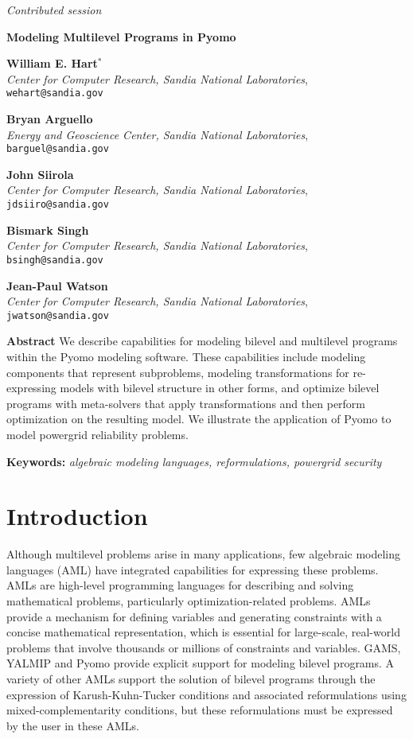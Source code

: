 \documentclass[a4paper,11pt]{article}
\newenvironment{vuoto}{}{}
\newenvironment{abst}{
\textbf{Abstract}\begin{vuoto}}{
\end{vuoto}}
\newenvironment{keyw}{
\textbf{Keywords:}\begin{vuoto}}{
\end{vuoto}}
\newcommand{\papertitle}[1]{%
\begin{center}
\LARGE \textbf{#1} \\
\vspace*{0.5cm}
}
\newcommand{\session}[1]{%
\newpage
\begin{center}
\textit{#1} \\
\end{center}
\vspace*{0.5cm}
}
\newcommand{\presentername}[1]{%
\normalsize
\textbf{#1}$^*$ \\
}
\newcommand{\presenteraffiliation}[2]{%
\normalsize \emph{#1}, \texttt{#2} \\
\vspace*{1ex} 
}
\newcommand{\coauthorname}[1]{%
\normalsize
\textbf{#1} \\
}
\newcommand{\paperabstract}[1]{%
\setcounter{figure}{0}
\end{center}
\begin{abst}
\normalsize #1
\end{abst}
\vspace*{1ex}
}
\newcommand{\paperkeywords}[1]{%
\begin{keyw}
\normalsize \emph{#1}
\end{keyw}
\vspace*{1ex}
}
\begin{document}


\session{Contributed session}
\papertitle{Modeling Multilevel Programs in Pyomo}
\presentername{William E. Hart}
\presenteraffiliation{Center for Computer Research, Sandia National Laboratories}{wehart@sandia.gov}
\coauthorname{Bryan Arguello}
\presenteraffiliation{Energy and Geoscience Center, Sandia National Laboratories}{barguel@sandia.gov}
\coauthorname{John Siirola}
\presenteraffiliation{Center for Computer Research, Sandia National Laboratories}{jdsiiro@sandia.gov}
\coauthorname{Bismark Singh}
\presenteraffiliation{Center for Computer Research, Sandia National Laboratories}{bsingh@sandia.gov}
\coauthorname{Jean-Paul Watson}
\presenteraffiliation{Center for Computer Research, Sandia National Laboratories}{jwatson@sandia.gov}


\paperabstract{
We describe capabilities for modeling bilevel and multilevel programs
within the Pyomo modeling software.  These capabilities include
modeling components that represent subproblems, modeling transformations
for re-expressing models with bilevel structure in other forms, and
optimize bilevel programs with meta-solvers that apply transformations
and then perform optimization on the resulting model.  We illustrate
the application of Pyomo to model powergrid reliability problems.
}


\paperkeywords{algebraic modeling languages, reformulations, powergrid security}

\section{Introduction}

Although multilevel problems arise in many applications, few algebraic
modeling languages (AML) have integrated capabilities for expressing
these problems.  AMLs are high-level programming languages for
describing and solving mathematical problems, particularly
optimization-related problems.  AMLs provide a mechanism
for defining variables and generating constraints with a concise
mathematical representation, which is essential for large-scale,
real-world problems that involve thousands or millions of constraints
and variables.  GAMS, YALMIP and Pyomo
provide explicit support for modeling bilevel programs.  A variety
of other AMLs support the solution of bilevel programs through the
expression of Karush-Kuhn-Tucker conditions and associated
reformulations using mixed-complementarity conditions, but these
reformulations must be expressed by the user in these AMLs.
\end{document}
